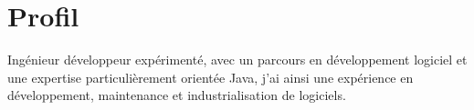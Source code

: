 \section{Profil}

\small
Ingénieur développeur expérimenté, avec un parcours en développement logiciel
et une expertise particulièrement orientée Java, j'ai ainsi une expérience en développement, maintenance et industrialisation de logiciels.
